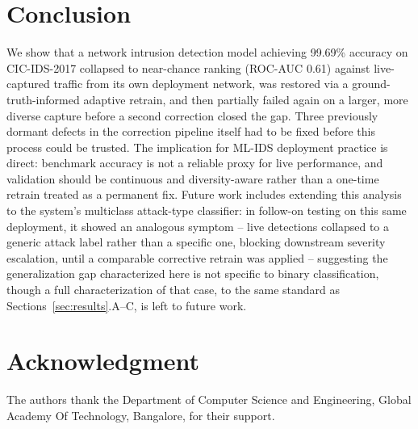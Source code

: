 \documentclass[conference]{IEEEtran}
\begin{document}
\section{Conclusion}
\label{sec:conclusion}

We show that a network intrusion detection model achieving 99.69\%
accuracy on CIC-IDS-2017 collapsed to near-chance ranking (ROC-AUC 0.61)
against live-captured traffic from its own deployment network, was
restored via a ground-truth-informed adaptive retrain, and then partially
failed again on a larger, more diverse capture before a second correction
closed the gap. Three previously dormant defects in the correction
pipeline itself had to be fixed before this process could be trusted. The
implication for ML-IDS deployment practice is direct: benchmark accuracy
is not a reliable proxy for live performance, and validation should be
continuous and diversity-aware rather than a one-time retrain treated as a
permanent fix. Future work includes extending this analysis to the
system's multiclass attack-type classifier: in follow-on testing on this
same deployment, it showed an analogous symptom -- live detections
collapsed to a generic attack label rather than a specific one, blocking
downstream severity escalation, until a comparable corrective retrain was
applied -- suggesting the generalization gap characterized here is not
specific to binary classification, though a full characterization of that
case, to the same standard as Sections~\ref{sec:results}.A--C, is left to
future work.

\section*{Acknowledgment}
The authors thank the Department of Computer Science and Engineering,
Global Academy Of Technology, Bangalore, for their support.

\balance


\end{document}
